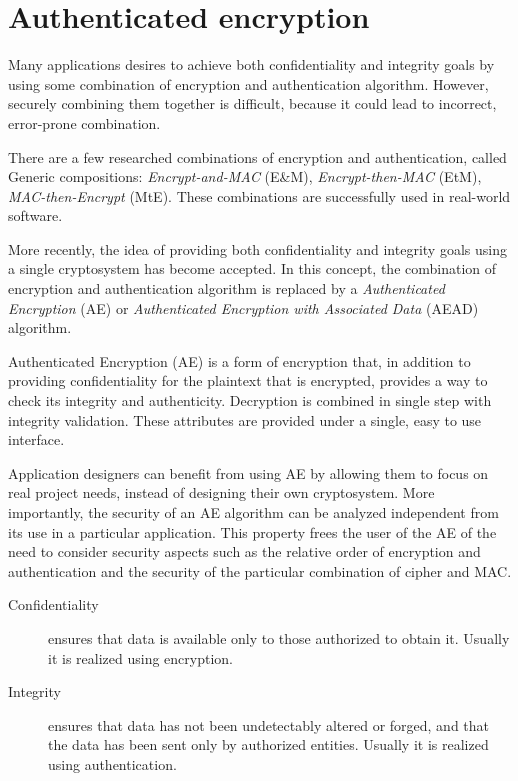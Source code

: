\section{Authenticated encryption}
\label{toc/authenticated-encryption}

Many applications desires to achieve both confidentiality and integrity goals by using some combination of encryption and authentication algorithm. However, securely combining them together is difficult, because it could lead to incorrect, error-prone combination.

There are a few researched combinations of encryption and authentication, called Generic compositions: \textit{Encrypt-and-MAC} (E\&M), \textit{Encrypt-then-MAC} (EtM), \textit{MAC-then-Encrypt} (MtE). These combinations are successfully used in real-world software.

More recently, the idea of providing both confidentiality and integrity goals using a single cryptosystem has become accepted. In this concept, the combination of encryption and authentication algorithm is replaced by a \textit{Authenticated Encryption} (AE) or \textit{Authenticated Encryption with Associated Data} (AEAD) algorithm.

Authenticated Encryption (AE) is a form of encryption that, in addition to providing confidentiality for the plaintext that is encrypted, provides a way to check its integrity and authenticity. Decryption is combined in single step with integrity validation. These attributes are provided under a single, easy to use interface.

Application designers can benefit from using AE by allowing them to focus on real project needs, instead of designing their own cryptosystem. More importantly, the security of an AE algorithm can be analyzed independent from its use in a particular application. This property frees the user of the AE of the need to consider security aspects such as the relative order of encryption and authentication and the security of the particular combination of cipher and MAC.

\begin{description}
  \item[Confidentiality] ensures that data is available only to those authorized to obtain it. Usually it is realized using encryption.
  \item[Integrity] ensures that data has not been undetectably altered or forged, and that the data has been sent only by authorized entities. Usually it is realized using authentication.
\end{description}


